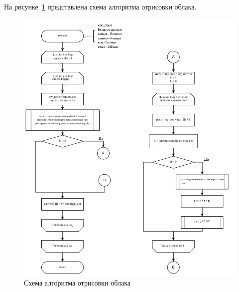 На рисунке~\ref{fig:cloud_fc} представлена схема алгоритма отрисовки облака.
\begin{figure}[ht!]
	\centering
	\includegraphics[width=1.05\textwidth, page=1]{assets/img/cloud_flowchart.pdf}   
	\caption{Схема алгоритма отрисовки облака}
	\label{fig:cloud_fc}
\end{figure}

